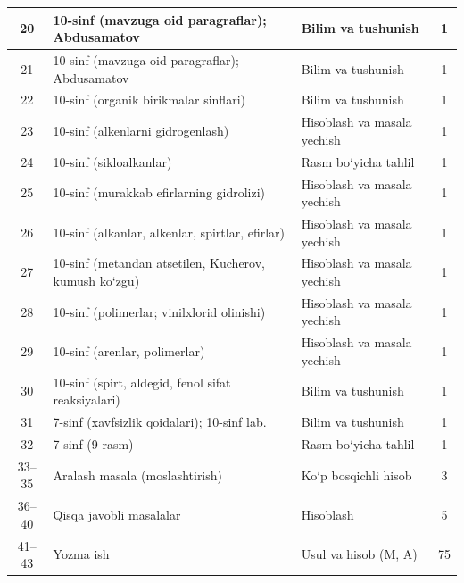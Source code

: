 \documentclass[11pt,a4paper]{article}
\begin{document}
{\begin{longtable}{|c|p{7.2cm}|p{5.4cm}|c|}
20 & 10-sinf (mavzuga oid paragraflar); Abdusamatov & Bilim va tushunish & 1\\\hline
21 & 10-sinf (mavzuga oid paragraflar); Abdusamatov & Bilim va tushunish & 1\\\hline
22 & 10-sinf (organik birikmalar sinflari) & Bilim va tushunish & 1\\\hline
23 & 10-sinf (alkenlarni gidrogenlash) & Hisoblash va masala yechish & 1\\\hline
24 & 10-sinf (sikloalkanlar) & Rasm bo`yicha tahlil & 1\\\hline
25 & 10-sinf (murakkab efirlarning gidrolizi) & Hisoblash va masala yechish & 1\\\hline
26 & 10-sinf (alkanlar, alkenlar, spirtlar, efirlar) & Hisoblash va masala yechish & 1\\\hline
27 & 10-sinf (metandan atsetilen, Kucherov, kumush ko`zgu) & Hisoblash va masala yechish & 1\\\hline
28 & 10-sinf (polimerlar; vinilxlorid olinishi) & Hisoblash va masala yechish & 1\\\hline
29 & 10-sinf (arenlar, polimerlar) & Hisoblash va masala yechish & 1\\\hline
30 & 10-sinf (spirt, aldegid, fenol sifat reaksiyalari) & Bilim va tushunish & 1\\\hline
31 & 7-sinf (xavfsizlik qoidalari); 10-sinf lab. & Bilim va tushunish & 1\\\hline
32 & 7-sinf (9-rasm) & Rasm bo`yicha tahlil & 1\\\hline
33--35 & Aralash masala (moslashtirish) & Ko`p bosqichli hisob & 3\\\hline
36--40 & Qisqa javobli masalalar & Hisoblash & 5\\\hline
41--43 & Yozma ish & Usul va hisob (M, A) & 75\\\hline
\end{longtable}}
\end{document}
